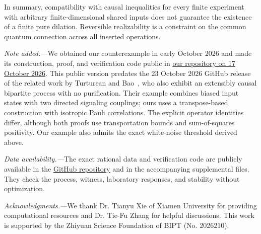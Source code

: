 \documentclass[aps,prl,reprint,superscriptaddress,longbibliography,bibnotes,floatfix]{revtex4-2}
\begin{document}
In summary, compatibility with causal inequalities for every finite experiment with arbitrary finite-dimensional shared inputs does not guarantee the existence of a finite pure dilation. Reversible realizability is a constraint on the common quantum connection across all inserted operations.

\emph{Note added.---}We obtained our counterexample in early October 2026 and made its construction, proof, and verification code public in \href{https://github.com/phycxli/Extensible-Causality-Does-Not-Guarantee-Pure-Quantum-Dilations/commit/83275aaf77860d34fcdc2bfc4aa39137e783fd6e}{our repository on 17 October 2026}. This public version predates the 23 October 2026 GitHub release of the related work by Turturean and Bao~\cite{TurtureanBao2026}, who also exhibit an extensibly causal bipartite process with no purification. Their example combines biased input states with two directed signaling couplings; ours uses a transpose-based construction with isotropic Pauli correlations. The explicit operator identities differ, although both proofs use transportation bounds and sum-of-squares positivity. Our example also admits the exact white-noise threshold derived above.

\emph{Data availability.---}The exact rational data and verification code are publicly available in the \href{https://github.com/phycxli/Extensible-Causality-Does-Not-Guarantee-Pure-Quantum-Dilations}{GitHub repository} and in the accompanying supplemental files. They check the process, witness, laboratory responses, and stability without optimization.

\emph{Acknowledgments.---}We thank Dr. Tianyu Xie of Xiamen University for providing computational resources and Dr. Tie-Fu Zhang for helpful discussions. This work is supported by the Zhiyuan Science Foundation of BIPT (No. 2026210).
\end{document}
